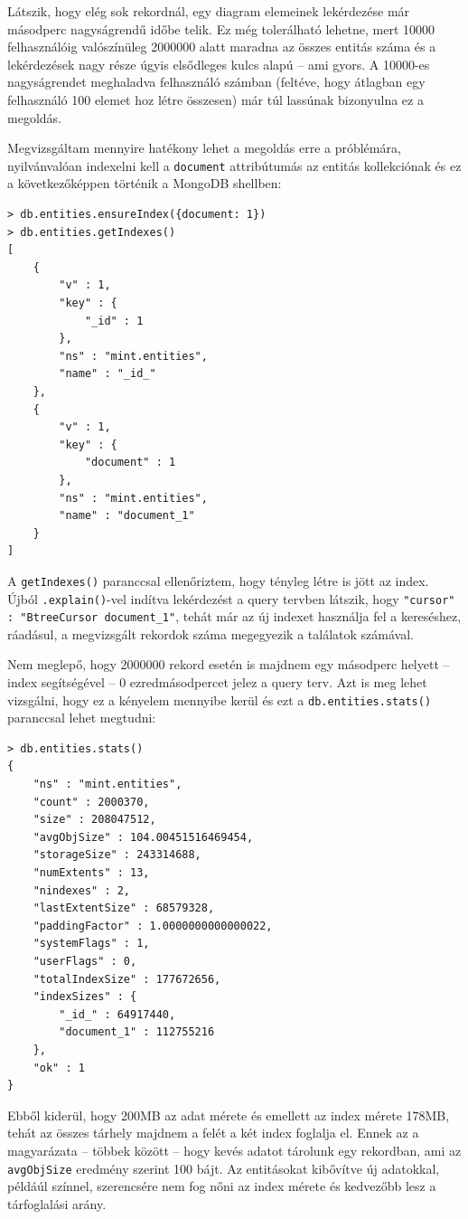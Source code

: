 Látszik, hogy elég sok rekordnál, egy diagram elemeinek lekérdezése már másodperc nagyságrendű időbe telik. Ez még tolerálható lehetne, mert 10000 felhasználóig valószínüleg 2000000 alatt maradna az összes entitás száma és a lekérdezések nagy része úgyis elsődleges kulcs alapú -- ami gyors. A 10000-es nagyságrendet meghaladva felhasználó számban (feltéve, hogy átlagban egy felhasználó 100 elemet hoz létre összesen) már túl lassúnak bizonyulna ez a megoldás.

Megvizsgáltam mennyire hatékony lehet a megoldás erre a próblémára, nyilvánvalóan indexelni kell a \lstinline{document} attribútumás az entitás kollekciónak és ez a következőképpen történik a MongoDB shellben:

\begin{lstlisting}[caption=Index létrehozása]
> db.entities.ensureIndex({document: 1})
> db.entities.getIndexes()
[
    {
        "v" : 1,
        "key" : {
            "_id" : 1
        },
        "ns" : "mint.entities",
        "name" : "_id_"
    },
    {
        "v" : 1,
        "key" : {
            "document" : 1
        },
        "ns" : "mint.entities",
        "name" : "document_1"
    }
]
\end{lstlisting}

A \lstinline{getIndexes()} paranccsal ellenőriztem, hogy tényleg létre is jött az index. Újból \lstinline{.explain()}-vel indítva lekérdezést a query tervben látszik, hogy \lstinline{"cursor" : "BtreeCursor document_1"}, tehát már az új indexet használja fel a kereséshez, ráadásul, a megvizsgált rekordok száma megegyezik a találatok számával. 

Nem meglepő, hogy 2000000 rekord esetén is majdnem egy másodperc helyett -- index segítségével -- 0 ezredmásodpercet jelez a query terv. Azt is meg lehet vizsgálni, hogy ez a kényelem mennyibe kerül és ezt a \lstinline{db.entities.stats()} paranccsal lehet megtudni:

\begin{lstlisting}[caption=Kollekció és index nagysága]
> db.entities.stats()
{
    "ns" : "mint.entities",
    "count" : 2000370,
    "size" : 208047512,
    "avgObjSize" : 104.00451516469454,
    "storageSize" : 243314688,
    "numExtents" : 13,
    "nindexes" : 2,
    "lastExtentSize" : 68579328,
    "paddingFactor" : 1.0000000000000022,
    "systemFlags" : 1,
    "userFlags" : 0,
    "totalIndexSize" : 177672656,
    "indexSizes" : {
        "_id_" : 64917440,
        "document_1" : 112755216
    },
    "ok" : 1
} 
\end{lstlisting}

Ebből kiderül, hogy 200MB az adat mérete és emellett az index mérete 178MB, tehát az összes tárhely majdnem a felét a két index foglalja el. Ennek az a magyarázata -- többek között -- hogy kevés adatot tárolunk egy rekordban, ami az \lstinline{avgObjSize} eredmény szerint 100 bájt. Az entitásokat kibővítve új adatokkal, példáúl színnel, szerencsére nem fog nőni az index mérete és kedvezőbb lesz a tárfoglalási arány.


